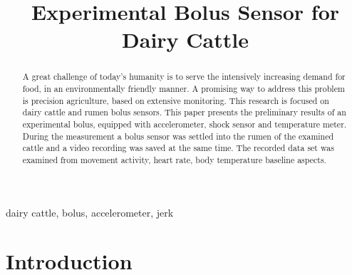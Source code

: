\documentclass[conference]{IEEEtran}
\begin{document}
\title{Experimental Bolus Sensor for Dairy Cattle\\
}

\author{
\and
{}
\and
{}
}

\maketitle

\begin{abstract}
  A great challenge of today's humanity is to serve the intensively
  increasing demand for food, in an environmentally friendly manner.
  A promising way to address this problem is precision agriculture,
  based on extensive monitoring. This research is focused on dairy
  cattle and rumen bolus sensors. This paper presents the preliminary
  results of an experimental bolus, equipped with accelerometer,
  shock sensor and temperature meter. During the measurement a bolus sensor was settled into the rumen of the examined cattle and a video recording was saved at the same time. The recorded data set was examined from movement activity, heart rate, body temperature baseline aspects.
\end{abstract}

\begin{IEEEkeywords}
  dairy cattle, bolus, accelerometer, jerk
\end{IEEEkeywords}

\section{Introduction}
\end{document}
